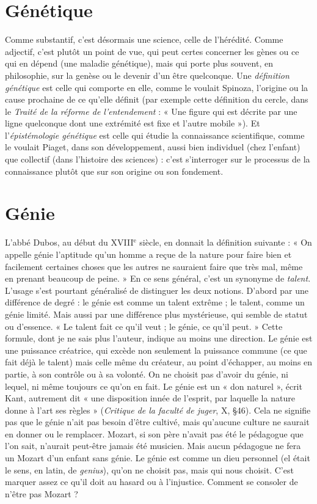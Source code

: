 \section{Génétique}
Comme substantif, c’est désormais une science, celle de
l’hérédité. Comme adjectif, c’est plutôt un point de vue, qui
peut certes concerner les gènes ou ce qui en dépend (une maladie génétique),
mais qui porte plus souvent, en philosophie, sur la genèse ou le devenir d’un
être quelconque. Une {\it définition génétique} est celle qui comporte en elle, comme
le voulait Spinoza, l’origine ou la cause prochaine de ce qu’elle définit (par
exemple cette définition du cercle, dans le {\it Traité de la réforme de l'entendement} :
« Une figure qui est décrite par une ligne quelconque dont une extrémité est
fixe et l’autre mobile »). Et l’{\it épistémologie génétique} est celle qui étudie la
connaissance scientifique, comme le voulait Piaget, dans son développement,
aussi bien individuel (chez l’enfant) que collectif (dans l’histoire des sciences) :
c’est s'interroger sur le processus de la connaissance plutôt que sur son origine
ou son fondement.

\section{Génie}
L'abbé Dubos, au début du {\footnotesize XVIII$^\text{e}$} siècle, en donnait la définition suivante :
« On appelle génie l'aptitude qu’un homme a reçue de la
nature pour faire bien et facilement certaines choses que les autres ne sauraient
faire que très mal, même en prenant beaucoup de peine. » En ce sens général,
c’est un synonyme de {\it talent}. L'usage s’est pourtant généralisé de distinguer les
deux notions. D’abord par une différence de degré : le génie est comme un
talent extrême ; le talent, comme un génie limité. Mais aussi par une différence
plus mystérieuse, qui semble de statut ou d’essence. « Le talent fait ce qu'il
veut ; le génie, ce qu’il peut. » Cette formule, dont je ne sais plus l’auteur,
indique au moins une direction. Le génie est une puissance créatrice, qui
excède non seulement la puissance commune (ce que fait déjà le talent) mais
celle même du créateur, au point d'échapper, au moins en partie, à son contrôle
ou à sa volonté. On ne choisit pas d’avoir du génie, ni lequel, ni même toujours
ce qu’on en fait. Le génie est un « don naturel », écrit Kant, autrement dit « une
disposition innée de l'esprit, par laquelle la nature donne à l’art ses règles »
({\it Critique de la faculté de juger}, X, \S 46). Cela ne signifie pas que le génie n’ait
pas besoin d’être cultivé, mais qu'aucune culture ne saurait en donner ou le
remplacer. Mozart, si son père n'avait pas été le pédagogue que l’on sait,
n’aurait peut-être jamais été musicien. Mais aucun pédagogue ne fera un
Mozart d’un enfant sans génie. Le génie est comme un dieu personnel (el était
le sens, en latin, de {\it genius}), qu’on ne choisit pas, mais qui nous choisit. C’est
marquer assez ce qu’il doit au hasard ou à l'injustice. Comment se consoler de
n'être pas Mozart ?

